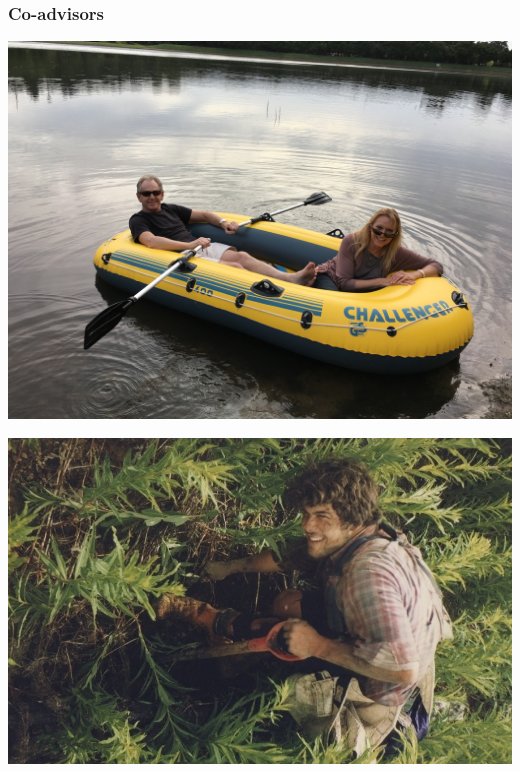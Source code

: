 \documentclass{beamer}
\begin{document}
\begin{frame}
\frametitle{Co-advisors}
\begin{center}
\includegraphics[scale = 0.04]{IMG_0703.JPG}

\includegraphics[scale = 0.2]{JonathanTreeRot.jpg}
\end{center}
\end{frame}
\end{document}
